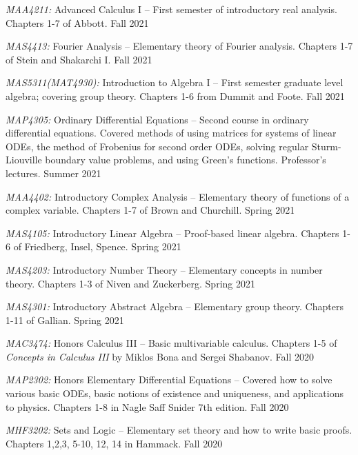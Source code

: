 \documentclass[11pt]{article}
\begin{document}
\textsl{MAA4211:} Advanced Calculus I -- First semester of introductory real analysis. Chapters 1-7 of Abbott. Fall 2021

\textsl{MAS4413:} Fourier Analysis -- Elementary theory of Fourier analysis. Chapters 1-7 of Stein and Shakarchi I. Fall 2021

\textsl{MAS5311(MAT4930)\textsuperscript{\textdagger}:} Introduction to Algebra I -- First semester graduate level algebra; covering group theory. Chapters 1-6 from Dummit and Foote. Fall 2021

\textsl{MAP4305:} Ordinary Differential Equations -- Second course in ordinary differential equations. Covered methods of using matrices for systems of linear ODEs, the method of Frobenius for second order ODEs, solving regular Sturm-Liouville boundary value problems, and using Green's functions. Professor's lectures. Summer 2021

\textsl{MAA4402:} Introductory Complex Analysis -- Elementary theory of functions of a complex variable. Chapters 1-7 of Brown and Churchill. Spring 2021

\textsl{MAS4105:} Introductory Linear Algebra -- Proof-based linear algebra. Chapters 1-6 of Friedberg, Insel, Spence. Spring 2021

\textsl{MAS4203:} Introductory Number Theory -- Elementary concepts in number theory. Chapters 1-3 of Niven and Zuckerberg. Spring 2021

\textsl{MAS4301:} Introductory Abstract Algebra -- Elementary group theory. Chapters 1-11 of Gallian. Spring 2021

\textsl{MAC3474:} Honors Calculus III -- Basic multivariable calculus. Chapters 1-5 of \textsl{Concepts in Calculus III} by Miklos Bona and Sergei Shabanov. Fall 2020

\textsl{MAP2302:} Honors Elementary Differential Equations -- Covered how to solve various basic ODEs, basic notions of existence and uniqueness, and applications to physics. Chapters 1-8 in Nagle Saff Snider 7th edition. Fall 2020

\textsl{MHF3202:} Sets and Logic -- Elementary set theory and how to write basic proofs. Chapters 1,2,3, 5-10, 12, 14 in Hammack. Fall 2020
\end{document}
